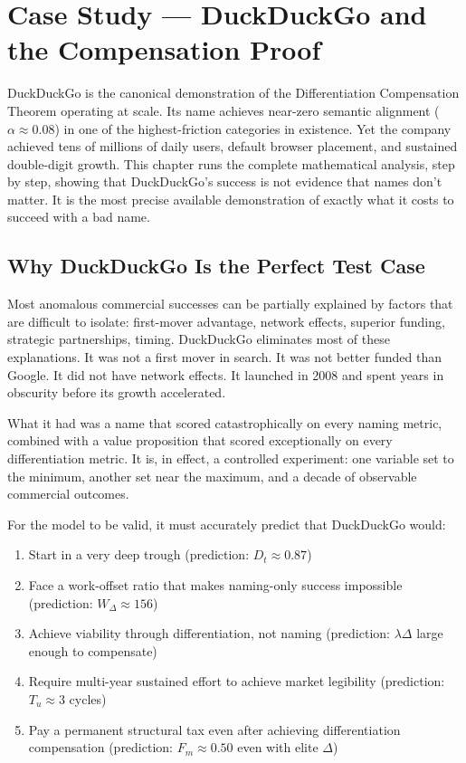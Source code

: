 \documentclass[12pt, openany]{book}
\theoremstyle{thmstyle}
\theoremstyle{defstyle}
\begin{document}
\chapter{Case Study --- DuckDuckGo and the Compensation Proof}

\begin{keybox}
DuckDuckGo is the canonical demonstration of the Differentiation Compensation Theorem operating at scale. Its name achieves near-zero semantic alignment ($\alpha \approx 0.08$) in one of the highest-friction categories in existence. Yet the company achieved tens of millions of daily users, default browser placement, and sustained double-digit growth. This chapter runs the complete mathematical analysis, step by step, showing that DuckDuckGo's success is not evidence that names don't matter. It is the most precise available demonstration of exactly what it costs to succeed with a bad name.
\end{keybox}

\section{Why DuckDuckGo Is the Perfect Test Case}

Most anomalous commercial successes can be partially explained by factors that are difficult to isolate: first-mover advantage, network effects, superior funding, strategic partnerships, timing. DuckDuckGo eliminates most of these explanations. It was not a first mover in search. It was not better funded than Google. It did not have network effects. It launched in 2008 and spent years in obscurity before its growth accelerated.

What it had was a name that scored catastrophically on every naming metric, combined with a value proposition that scored exceptionally on every differentiation metric. It is, in effect, a controlled experiment: one variable set to the minimum, another set near the maximum, and a decade of observable commercial outcomes.

For the model to be valid, it must accurately predict that DuckDuckGo would:
\begin{enumerate}[leftmargin=1.5em]
  \item Start in a very deep trough (prediction: $D_t \approx 0.87$)
  \item Face a work-offset ratio that makes naming-only success impossible (prediction: $W_\Delta \approx 156$)
  \item Achieve viability through differentiation, not naming (prediction: $\lambda\Delta$ large enough to compensate)
  \item Require multi-year sustained effort to achieve market legibility (prediction: $T_u \approx 3$ cycles)
  \item Pay a permanent structural tax even after achieving differentiation compensation (prediction: $F_m \approx 0.50$ even with elite $\Delta$)
\end{enumerate}
\end{document}
